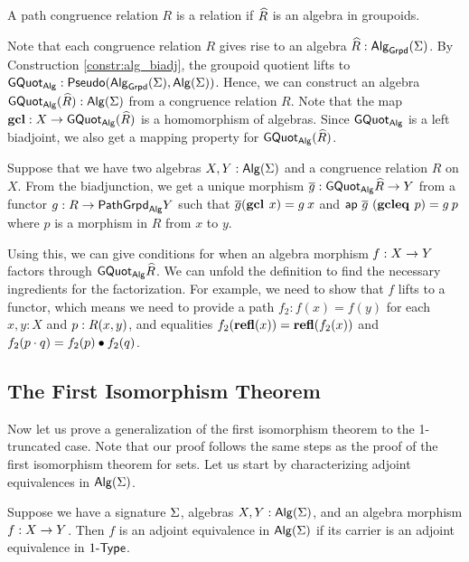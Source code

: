 \begin{definition}
A path congruence relation $R$ is a  relation if $\widehat{R}$ is an algebra in groupoids.
\end{definition}

Note that each congruence relation $R$ gives rise to an algebra $\widehat{R} : \mathsf{Alg}_{\mathsf{Grpd}}(\Sigma)$.
By Construction \ref{constr:alg_biadj}, the groupoid quotient lifts to $\mathsf{GQuot}_{\mathsf{Alg}} : \mathsf{Pseudo}(\mathsf{Alg}_{\mathsf{Grpd}}(\Sigma), \mathsf{Alg}(\Sigma))$.
Hence, we can construct an algebra $\mathsf{GQuot}_{\mathsf{Alg}}(\widehat{R}) : \mathsf{Alg}(\Sigma)$ from a congruence relation $R$.
Note that the map $\operatorname{\mathbf{gcl}} : X \rightarrow \mathsf{GQuot}_{\mathsf{Alg}}(\widehat{R})$ is a homomorphism of algebras.
Since $\mathsf{GQuot}_{\mathsf{Alg}}$ is a left biadjoint, we also get a mapping property for $\mathsf{GQuot}_{\mathsf{Alg}}(\widehat{R})$.

\begin{remark}
\label{remark:mapping_property_congruence}
Suppose that we have two algebras $X, Y : \mathsf{Alg}(\Sigma)$ and a congruence relation $R$ on $X$.
From the biadjunction, we get a unique morphism $\overline{g} : \mathsf{GQuot}_{\mathsf{Alg}}{\widehat{R}} \rightarrow Y$ from a functor $g : R \rightarrow \mathsf{PathGrpd}_{\mathsf{Alg}}{Y}$ such that $\overline{g}(\operatorname{\mathbf{gcl}} \> x) = g \> x$ and $\mathsf{ap} \ \overline{g} \ (\operatorname{\mathbf{gcleq}} \> p) = g \> p$ where $p$ is a morphism in $R$ from $x$ to $y$.

Using this, we can give conditions for when an algebra morphism $f : X \rightarrow Y$ factors through $\mathsf{GQuot}_{\mathsf{Alg}}{\widehat{R}}$.
We can unfold the definition to find the necessary ingredients for the factorization.
For example, we need to show that $f$ lifts to a functor, which means we need to provide a path $f_2 : f(x) = f(y)$ for each $x, y : X$ and $p : R(x, y)$, and equalities $f_2(\operatorname{\mathbf{refl}}(x)) =\operatorname{\mathbf{refl}}(f_2(x))$ and $f_2(p \cdot q) = f_2(p) \bullet f_2(q)$.
\end{remark}

\subsection{The First Isomorphism Theorem}
Now let us prove a generalization of the first isomorphism theorem to the 1-truncated case.
Note that our proof follows the same steps as the proof of the first isomorphism theorem for sets.
Let us start by characterizing adjoint equivalences in $\mathsf{Alg}(\Sigma)$.

\begin{proposition}
\label{prop:algebra_adjequiv}
Suppose we have a signature $\Sigma$, algebras $X, Y : \mathsf{Alg}(\Sigma)$, and an algebra morphism $f : X \rightarrow Y$.
Then $f$ is an adjoint equivalence in $\mathsf{Alg}(\Sigma)$ if its carrier is an adjoint equivalence in $1\mbox{-}\mathsf{Type}$.
\end{proposition}

